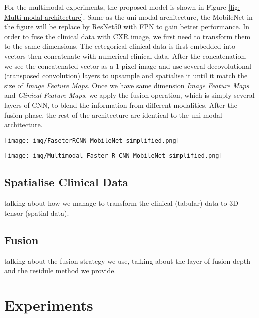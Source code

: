 \documentclass[journal,twoside,web, 11pt]{ieeecolor}
\begin{document}
For the multimodal experiments, the proposed model is shown in Figure \ref{fig: Multi-modal architecture}. Same as the uni-modal architecture, the MobileNet in the figure will be replace by ResNet50 with FPN to gain better performance. In order to fuse the clinical data with CXR image, we first need to transform them to the same dimensions. The cetegorical clinical data is first embedded into vectors then concatenate with numerical clinical data. After the concatenation, we see the concatenated vector as a 1 pixel image and use several decovolutional (transposed convolution) layers \cite{Zeiler2010Deconv} to upsample and spatialise it until it match the size of \textit{Image Feature Maps}. Once we have same dimension \textit{Image Feature Maps} and \textit{Clinical Feature Maps}, we apply the fusion operation, which is simply several layers of CNN, to blend the information from different modalities. After the fusion phase, the rest of the architecture are identical to the uni-modal architecture.\\

\begin{figure*}[!h]
    \centering
    \texttt{[image: img/FaseterRCNN-MobileNet simplified.png]}
    \caption{Multi-modal architecture.}
    \label{fig: Multi-modal architecture}
\end{figure*}


\begin{figure*}[!h]
    \centering
    \texttt{[image: img/Multimodal Faster R-CNN MobileNet simplified.png]}
    \caption{Uni-modal architecture.}
    \label{fig: Uni-modal architecture}
\end{figure*}

\subsection{Spatialise Clinical Data}
talking about how we manage to transform the clinical (tabular) data to 3D tensor (spatial data).

\subsection{Fusion} 
talking about the fusion strategy we use, talking about the layer of fusion depth and the residule method we provide.

\section{Experiments}
\end{document}
